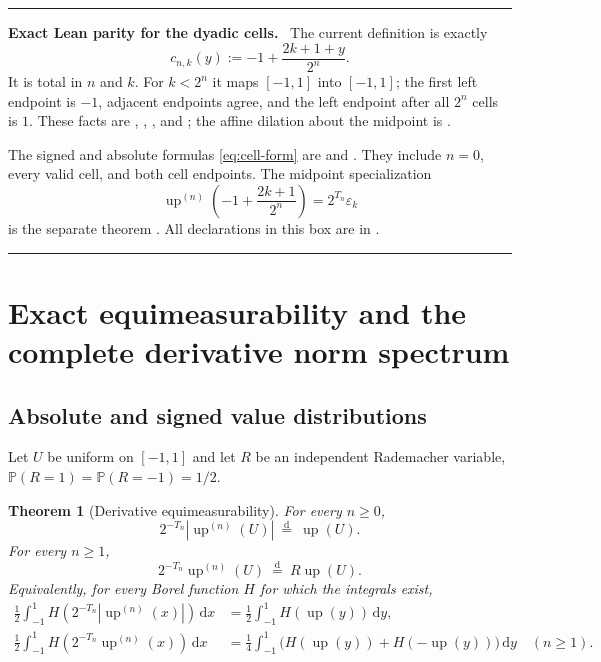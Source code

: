 \documentclass[11pt,oneside]{article}
\numberwithin{equation}{section}
\theoremstyle{plain}
\newtheorem{theorem}{Theorem}[section]
\theoremstyle{definition}
\theoremstyle{remark}
\newcommand{\Up}{\operatorname{up}}
\newcommand{\dd}{\,\mathrm d}
\newcommand{\Prob}{\mathbb P}
\newcommand{\abs}[1]{\left|#1\right|}
\newenvironment{statusbox}[1]{%
  \par\medskip\noindent\begin{minipage}{\textwidth}%
  \color{DeepBlue}\hrule\vspace{5pt}%
  \color{black}\textbf{\color{DeepBlue}#1.}\ }{%
  \par\vspace{5pt}\color{DeepBlue}\hrule
  \end{minipage}\par\medskip}
\begin{document}
\begin{statusbox}{Exact Lean parity for the dyadic cells}
The current definition
 is exactly
\[
 c_{n,k}(y):=-1+\frac{2k+1+y}{2^n}.
\]
It is total in \(n\) and \(k\).  For \(k<2^n\) it maps \([-1,1]\) into \([-1,1]\);
the first left endpoint is \(-1\), adjacent endpoints agree, and the left endpoint after
all \(2^n\) cells is \(1\).  These facts are
,
,
, and
; the affine dilation about the midpoint is
.

The signed and absolute formulas \eqref{eq:cell-form} are
 and
.  They include \(n=0\), every valid cell, and both
cell endpoints.  The midpoint specialization
\[
 \Up^{(n)}\!\left(-1+\frac{2k+1}{2^n}\right)
 =2^{T_n}\varepsilon_k
\]
is the separate theorem .  All declarations in this
box are in .
\end{statusbox}

\section{Exact equimeasurability and the complete derivative norm spectrum}
\label{sec:equimeasurability}

\subsection{Absolute and signed value distributions}

Let $U$ be uniform on $[-1,1]$ and let $R$ be an independent Rademacher variable,
$\Prob(R=1)=\Prob(R=-1)=1/2$.

\begin{theorem}[Derivative equimeasurability]
\label{thm:equimeasurable}
For every $n\geq0$,
\begin{equation}
 \boxed{
 2^{-T_n}\abs{\Up^{(n)}(U)}\ \overset{\mathrm d}=\ \Up(U).}
 \label{eq:absolute-equimeasurable}
\end{equation}
For every $n\geq1$,
\begin{equation}
 \boxed{
 2^{-T_n}\Up^{(n)}(U)\ \overset{\mathrm d}=\ R\Up(U).}
 \label{eq:signed-equimeasurable}
\end{equation}
Equivalently, for every Borel function $H$ for which the integrals exist,
\begin{align}
 \frac12\int_{-1}^{1}H\!\left(2^{-T_n}\abs{\Up^{(n)}(x)}\right)\dd x
 &=\frac12\int_{-1}^{1}H(\Up(y))\dd y,\label{eq:H-absolute}\\
 \frac12\int_{-1}^{1}H\!\left(2^{-T_n}\Up^{(n)}(x)\right)\dd x
 &=\frac14\int_{-1}^{1}\bigl(H(\Up(y))+H(-\Up(y))\bigr)\dd y
 \quad(n\geq1).
 \label{eq:H-signed}
\end{align}
\end{theorem}
\end{document}
